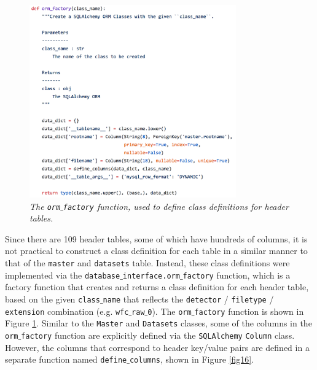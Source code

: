 \documentclass[10pt,journal,compsoc]{IEEEtran}
\begin{document}
\begin{figure}[!h]
\centering
\includegraphics[width=3.5in]{./figures/orm_factory.png}
\caption{\textit{The \texttt{orm$\_$factory} function, used to define class definitions for header tables.}}
\label{fig15}
\end{figure}

Since there are 109 header tables, some of which have hundreds of columns, it is not practical to construct a class definition for each table in a similar manner to that of the
\texttt{master} and \texttt{datasets} table.  Instead, these class definitions were implemented via the \texttt{database$\_$interface.orm$\_$factory} function, which is a factory
function that creates and returns a class definition for each header table, based on the given \texttt{class$\_$name} that reflects the
\texttt{detector} / \texttt{filetype} / \texttt{extension} combination (e.g. \texttt{wfc$\_$raw$\_$0}).  The \texttt{orm$\_$factory} function is shown in Figure \ref{fig15}.  Similar to the
\texttt{Master} and \texttt{Datasets} classes, some of the columns in the \texttt{orm$\_$factory} function are explicitly defined via the \texttt{SQLAlchemy} \texttt{Column} class.
However, the columns that correspond to header key/value pairs are defined in a separate function named \texttt{define$\_$columns}, shown in Figure \ref{fig16}.
\end{document}
